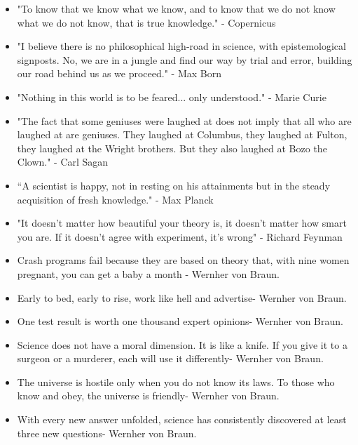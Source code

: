 \begin{itemize}
\item	"To know that we know what we know, and to know that we do not know what we do not know, that is true knowledge." - Copernicus
\item	"I believe there is no philosophical high-road in science, with epistemological signposts. No, we are in a jungle and find our way by trial and error, building our road behind us as we proceed." - Max Born
\item	"Nothing in this world is to be feared... only understood." - Marie Curie
\item	"The fact that some geniuses were laughed at does not imply that all who are laughed at are geniuses. They laughed at Columbus, they laughed at Fulton, they laughed at the Wright brothers. But they also laughed at Bozo the Clown." - Carl Sagan
\item	“A scientist is happy, not in resting on his attainments but in the steady acquisition of fresh knowledge." - Max Planck
\item	"It doesn't matter how beautiful your theory is, it doesn't matter how smart you are. If it doesn't agree with experiment, it's wrong" - Richard Feynman
\item	Crash programs fail because they are based on theory that, with nine women pregnant, you can get a baby a month - Wernher von Braun.
\item	Early to bed, early to rise, work like hell and advertise- Wernher von Braun.
\item	One test result is worth one thousand expert opinions- Wernher von Braun.
\item	Science does not have a moral dimension. It is like a knife. If you give it to a surgeon or a murderer, each will use it differently- Wernher von Braun.
\item	The universe is hostile only when you do not know its laws. To those who know and obey, the universe is friendly- Wernher von Braun.
\item	With every new answer unfolded, science has consistently discovered at least three new questions- Wernher von Braun.
\end{itemize}

